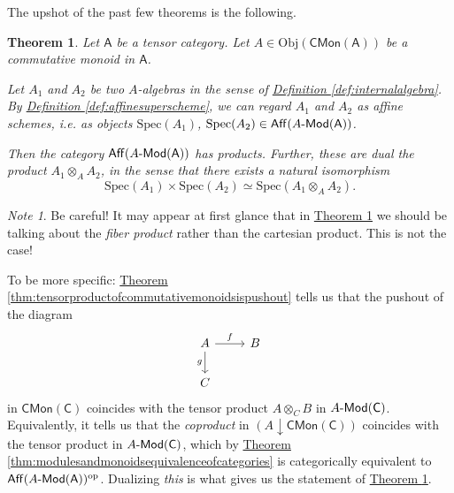 \documentclass[a4paper,10pt]{scrreprt}
\newcommand{\Obj}{\mathrm{Obj}}
\newcommand{\Spec}{\mathrm{Spec}}
\def\mhyp{{\hbox{-}}}
\theoremstyle{definition}
\theoremstyle{plain}
\newtheorem{theorem}{Theorem}[section]
\theoremstyle{remark}
\newtheorem{note}{Note}[section]
\begin{document}
The upshot of the past few theorems is the following.
\begin{theorem}
  \label{thm:quasiffinevarietieshaveproducts}
  Let $\mathsf{A}$ be a tensor category. Let $A \in \Obj(\mathsf{CMon}(\mathsf{A}))$ be a commutative monoid in $\mathsf{A}$.

  Let $A_{1}$ and $A_{2}$ be two $A$-algebras in the sense of \hyperref[def:internalalgebra]{Definition \ref*{def:internalalgebra}}. By \hyperref[def:affinesuperscheme]{Definition \ref*{def:affinesuperscheme}}, we can regard $A_{1}$ and $A_{2}$ as affine schemes, i.e. as objects $\Spec(A_{1})$, $\Spec(A_{2}) \in \mathsf{Aff}(A\mhyp\mathsf{Mod}(\mathsf{A}))$.

  Then the category $\mathsf{Aff}(A\mhyp\mathsf{Mod}(\mathsf{A}))$ has products. Further, these are dual the product $A_{1} \otimes_{A} A_{2}$, in the sense that there exists a natural isomorphism
  \begin{equation*}
    \Spec(A_{1}) \times \Spec(A_{2}) \simeq \Spec(A_{1} \otimes_{A} A_{2}).
  \end{equation*}
\end{theorem} 

\begin{note}
  Be careful! It may appear at first glance that in \hyperref[thm:quasiffinevarietieshaveproducts]{Theorem \ref*{thm:quasiffinevarietieshaveproducts}} we should be talking about the \emph{fiber product} rather than the cartesian product. This is not the case! 

  To be more specific: \hyperref[thm:tensorproductofcommutativemonoidsispushout]{Theorem \ref*{thm:tensorproductofcommutativemonoidsispushout}} tells us that the pushout of the diagram 
  \begin{equation*}
    \begin{tikzcd}
      A
      \arrow[r, "f"]
      \arrow[d, swap, "g"]
      & B
      \\
      C
    \end{tikzcd}
  \end{equation*}
  in $\mathsf{CMon}(\mathsf{C})$ coincides with the tensor product $A \otimes_{C} B$ in $A\mhyp\mathsf{Mod}(\mathsf{C})$. Equivalently, it tells us that the \emph{coproduct} in $(A \downarrow\mathsf{CMon}(\mathsf{C}))$ coincides with the tensor product in $A\mhyp\mathsf{Mod}(\mathsf{C})$, which by \hyperref[thm:modulesandmonoidsequivalenceofcategories]{Theorem \ref*{thm:modulesandmonoidsequivalenceofcategories}} is categorically equivalent to $\mathsf{Aff}(A\mhyp\mathsf{Mod}(\mathsf{A}))^{\mathrm{op}}$. Dualizing \emph{this} is what gives us the statement of \hyperref[thm:quasiffinevarietieshaveproducts]{Theorem \ref*{thm:quasiffinevarietieshaveproducts}}.
\end{note}
\end{document}
